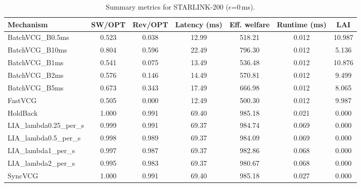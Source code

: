 \begin{table}[t]
\centering
\small
\setlength{\tabcolsep}{6pt}
\begin{tabular}{lcccccc}
\toprule
Mechanism & SW/OPT & Rev/OPT & Latency (ms) & Eff. welfare & Runtime (ms) & LAI \\
\midrule
BatchVCG_B0.5ms & 0.523 & 0.038 & 12.99 & 518.21 & 0.012 & 10.987 \\
BatchVCG_B10ms & 0.804 & 0.596 & 22.49 & 796.30 & 0.012 & 5.136 \\
BatchVCG_B1ms & 0.541 & 0.075 & 13.49 & 536.48 & 0.012 & 10.876 \\
BatchVCG_B2ms & 0.576 & 0.146 & 14.49 & 570.81 & 0.012 & 9.499 \\
BatchVCG_B5ms & 0.673 & 0.343 & 17.49 & 666.98 & 0.012 & 8.065 \\
FastVCG & 0.505 & 0.000 & 12.49 & 500.30 & 0.012 & 9.987 \\
HoldBack & 1.000 & 0.991 & 69.40 & 985.18 & 0.021 & 0.000 \\
LIA_lambda0.25_per_s & 0.999 & 0.991 & 69.37 & 984.74 & 0.069 & 0.000 \\
LIA_lambda0.5_per_s & 0.998 & 0.989 & 69.37 & 984.09 & 0.069 & 0.000 \\
LIA_lambda1_per_s & 0.997 & 0.987 & 69.37 & 982.86 & 0.068 & 0.000 \\
LIA_lambda2_per_s & 0.995 & 0.983 & 69.37 & 980.67 & 0.068 & 0.000 \\
SyncVCG & 1.000 & 0.991 & 69.40 & 985.18 & 0.027 & 0.000 \\
\bottomrule
\end{tabular}
\caption{Summary metrics for STARLINK-200 ($\epsilon$=0\,ms).}
\label{tab:starlink200_eps0p0}
\end{table}

